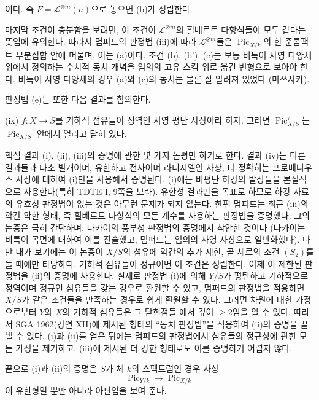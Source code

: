 \documentclass[11pt,twoside,openany]{book}
\numberwithin{equation}{section}
\newcommand{\sourceunit}{front}
\newcommand{\src}[1]{%
  \phantomsection\hypertarget{src:\sourceunit:#1}{}%
  \marginpar{\raggedleft\footnotesize\sffamily #1}%
}
\theoremstyle{plain}
\theoremstyle{definition}
\theoremstyle{remark}
\begin{document}
\src{306}
이다. 즉 $F=\mathcal L^{\otimes m}(n)$으로 놓으면 (b)가 성립한다.

마지막 조건이 충분함을 보려면, 이 조건이 $\mathcal L^{\otimes m}$의
힐베르트 다항식들이 모두 같다는 뜻임에 유의한다. 따라서 멈퍼드의 판정법
(iii)에 따라 $\mathcal L^{\otimes m}$들은
$\operatorname{Pic}_{X/k}$의 한 준콤팩트 부분집합 안에 머물며, 이는
(a)이다. 조건 (b), (b'), (c)는 보통 비특이 사영 다양체 위에서 정의하는
수치적 동치 개념을 임의의 고유 스킴 위로 옮긴 변형으로 보아야 한다.
비특이 사영 다양체의 경우 (a)와 (c)의 동치는 물론 잘 알려져 있었다
(마쓰사카).

판정법 (e)는 또한 다음 결과를 함의한다.

\medskip
\noindent(ix) $f:X\longrightarrow S$를 기하적 섬유들이 정역인 사영
평탄 사상이라 하자. 그러면 $\operatorname{Pic}_{X/S}^\tau$는
$\operatorname{Pic}_{X/S}$ 안에서 열리고 닫혀 있다.

핵심 결과 (i), (ii), (iii)의 증명에 관한 몇 가지 논평만 하기로 한다.
결과 (iv)는 다른 결과들과 다소 별개이며, 유한하고 전사이며 라디시엘인
사상, 더 정확히는 프로베니우스 사상에 대하여 (i)만을 사용해서 증명된다.
(i)에는 비평탄 하강의 발상들을 본질적으로 사용한다(특히 TDTE I, 9쪽을
보라). 유한성 결과만을 목표로 하므로 하강 자료의 유효성 판정법이 없는
것은 아무런 문제가 되지 않는다. 한편 멈퍼드는 최근 (iii)의 약간 약한
형태, 즉 힐베르트 다항식의 모든 계수를 사용하는 판정법을 증명했다. 그의
논증은 극히 간단하며, 나카이의 풍부성 판정법의 증명에서 착안한 것이다
(나카이는 비특이 곡면에 대하여 이를 진술했고, 멈퍼드는 임의의 사영
사상으로 일반화했다). 다만 내가 보기에는 이 논증이 $X/S$의 섬유에
약간의 추가 제한, 곧 세르의 조건 $(S_2)$를 둘 때에만 타당하다. 기하적
섬유들이 정규이면 이 조건은 성립한다. 이제 이 제한된 판정법을 (ii)의
증명에 사용한다. 실제로 판정법 (i)에 의해 $Y/S$가 평탄하고 기하적으로
정역이며 정규인 섬유들을 갖는 경우로 환원할 수 있고, 멈퍼드의 판정법을
적용하면 $X/S$가 같은 조건들을 만족하는 경우로 쉽게 환원할 수 있다.
그러면 차원에 대한 가정으로부터 $Y$와 $X$의 기하적 섬유들은 그 닫힌점들
에서 깊이 $\geq2$임을 알 수 있다. 따라서 SGA 1962(강연 XII)에 제시된
형태의 ``동치 판정법''을 적용하여 (ii)의 증명을 끝낼 수 있다. (i)과
(ii)를 얻은 뒤에는 멈퍼드의 판정법에서 섬유들의 정규성에 관한 모든
가정을 제거하고, (iii)에 제시된 더 강한 형태로도 이를 증명하기 어렵지
않다.

\src{307}
끝으로 (i)과 (ii)의 증명은 $S$가 체 $k$의 스펙트럼인 경우 사상
\[
\operatorname{Pic}_{Y/k}\longrightarrow\operatorname{Pic}_{X/k}
\]
이 유한형일 뿐만 아니라 아핀임을 보여 준다.
\end{document}
